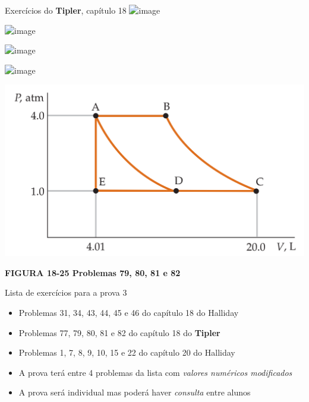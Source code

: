 \documentclass[t,%
brazilian,%
11pt,%
aspectratio=169,%
table%
]{beamer}
\begin{document}

\begin{frame}{Exercícios do \textbf{Tipler}, capítulo 18}
    \centering
    \includegraphics<+>[width=\textwidth]{images/Captura de tela de 2024-03-20 09-32-41.png}

    \includegraphics<+>[width=\textwidth]{images/Captura de tela de 2024-03-20 09-32-52.png}

    \includegraphics<+>[width=\textwidth]{images/Captura de tela de 2024-03-20 09-33-11.png}

    \includegraphics<+>[width=\textwidth]{images/Captura de tela de 2024-03-20 09-33-25.png}

    \includegraphics[width=\textwidth-133pt*\real{1.74}]{images/figura_18-25.png}

    \textbf{FIGURA 18-25 Problemas 79, 80, 81 e 82}

\end{frame}

\begin{frame}{Lista de exercícios para a prova 3}
    \begin{itemize}
        \item Problemas 31, 34, 43, 44, 45 e 46 do capítulo 18 do Halliday
        \item Problemas 77, 79, 80, 81 e 82  do capítulo 18 do \textbf{Tipler}
        \item Problemas 1, 7, 8, 9, 10, 15 e 22 do capítulo 20 do Halliday
        \item A prova terá entre 4 problemas da lista com \textit{valores
            numéricos modificados}
        \item A prova será individual mas poderá haver \textit{consulta} entre alunos
    \end{itemize}
\end{frame}
\end{document}
